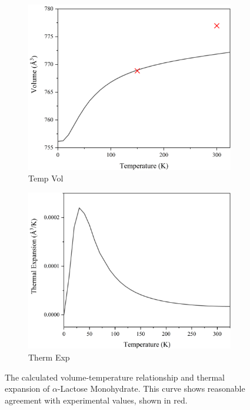 \begin{figure}[ht]
\centering

\begin{subfigure}{0.49\textwidth}
\centering
\includegraphics[width=\textwidth]{Figures/Misc/QHA/TempVolG2.png}
\caption{Temp Vol}
\label{fig:tempvol}
\end{subfigure}
\begin{subfigure}{0.49\textwidth}
\centering
\includegraphics[width=\textwidth]{Figures/Misc/QHA/ThermExpG2.png}
\caption{Therm Exp}
\label{fig:thermexp}
\end{subfigure}

\captionsetup{font = footnotesize, justification = centering}
\caption[The Calculated Volume-Temperature Relationship and Thermal Expansion of \(\alpha\)-Lactose Monohydrate]{The calculated volume-temperature relationship and thermal expansion of \(\alpha\)-Lactose Monohydrate. This curve shows reasonable agreement with experimental values, shown in red.}
\label{Fig:tempvol+thermext}
\end{figure}

